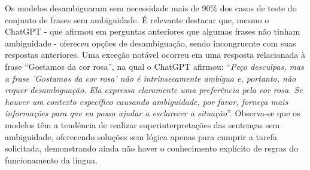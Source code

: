 Os modelos desambiguaram sem necessidade mais de 90\% dos casos de teste do conjunto de frases sem ambiguidade. É relevante destacar que, mesmo o ChatGPT - que afirmou em perguntas anteriores que algumas frases não tinham ambiguidade - ofereceu opções de desambiguação, sendo incongruente com suas respostas anteriores. Uma exceção notável ocorreu em uma resposta relacionada à frase \enquote{Gostamos da cor rosa}, na qual o ChatGPT afirmou: \enquote{\emph{Peço desculpas, mas a frase 'Gostamos da cor rosa' não é intrinsecamente ambígua e, portanto, não requer desambiguação. Ela expressa claramente uma preferência pela cor rosa. Se houver um contexto específico causando ambiguidade, por favor, forneça mais informações para que eu possa ajudar a esclarecer a situação}}. Observa-se que os modelos têm a tendência de realizar superinterpretações das sentenças sem ambiguidade, oferecendo soluções sem lógica apenas para cumprir a tarefa solicitada, demonstrando ainda não haver o conhecimento explícito de regras do funcionamento da língua.



